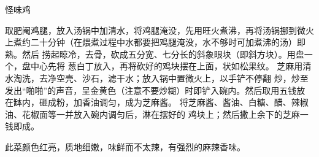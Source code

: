 \begin{recipe}{怪味鸡}

\ingredients


\preparation

\step 取肥阉鸡腿，放入汤锅中加清水，将鸡腿淹没，先用旺火煮沸，再将汤锅挪到微火
上煮约二十分钟（在煨煮过程中水都要把鸡腿淹没，水不够时可加煮沸的汤）即熟。然后
捞起晾冷，去骨，砍成五分宽、七分长的斜象眼块（即斜方块）。用盘一个，盘中心先将
葱白丁放入，再将砍好的鸡块摆在上面，状如松果纹。
\step 芝麻用清水淘洗，去净空壳、沙石，滤干水；放入锅中置微火上，以手铲不停翻
炒，炒至发出“啪啪”的声音，呈金黄色（注意不要炒糊）时即铲入碗内。然后取用五钱放
在缽内，砸成粉，加香油调匀，成为芝麻酱。
\step 将芝麻酱、酱油、白糖、醋、辣椒油、花椒面等一并放入碗内调匀后，淋在摆好的
鸡块上；然后撒上余下的芝麻一钱即成。

\features

此菜颜色红亮，质地细嫩，味鲜而不太辣，有强烈的麻辣香味。

\end{recipe}

